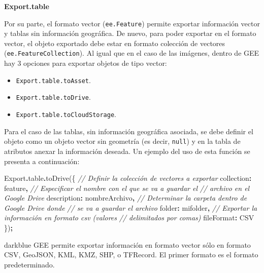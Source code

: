 \documentclass[
  12pt,
  letterpaper,
  twoside]{book}
\newenvironment{Shaded}{\begin{snugshade}}{\end{snugshade}}
\newcommand{\AttributeTok}[1]{\textcolor[rgb]{0.77,0.63,0.00}{#1}}
\newcommand{\CommentTok}[1]{\textcolor[rgb]{0.56,0.35,0.01}{\textit{#1}}}
\newcommand{\DataTypeTok}[1]{\textcolor[rgb]{0.13,0.29,0.53}{#1}}
\newcommand{\FunctionTok}[1]{\textcolor[rgb]{0.00,0.00,0.00}{#1}}
\newcommand{\NormalTok}[1]{#1}
\newcommand{\OperatorTok}[1]{\textcolor[rgb]{0.81,0.36,0.00}{\textbf{#1}}}
\newcommand{\StringTok}[1]{\textcolor[rgb]{0.31,0.60,0.02}{#1}}
\providecommand{\tightlist}{%
  \setlength{\itemsep}{0pt}\setlength{\parskip}{0pt}}
\begin{document}
\textbf{Export.table}

Por su parte, el formato vector (\texttt{ee.Feature}) permite exportar información vector y tablas sin información geográfica. De nuevo, para poder exportar en el formato vector, el objeto exportado debe estar en formato colección de vectores (\texttt{ee.FeatureCollection}). Al igual que en el caso de las imágenes, dentro de GEE hay 3 opciones para exportar objetos de tipo vector:

\begin{itemize}
\tightlist
\item
  \texttt{Export.table.toAsset}.
\item
  \texttt{Export.table.toDrive}.
\item
  \texttt{Export.table.toCloudStorage}.
\end{itemize}

Para el caso de las tablas, sin información geográfica asociada, se debe definir el objeto como un objeto vector sin geometría (es decir, \texttt{null}) y en la tabla de atributos anexar la información deseada. Un ejemplo del uso de esta función se presenta a continuación:

\begin{Shaded}
\begin{Highlighting}[]
\NormalTok{Export}\OperatorTok{.}\AttributeTok{table}\OperatorTok{.}\FunctionTok{toDrive}\NormalTok{(\{}
  \CommentTok{// Definir la colección de vectores a exportar}
  \DataTypeTok{collection}\OperatorTok{:}\NormalTok{ feature}\OperatorTok{,}
  \CommentTok{// Especificar el nombre con el que se va a guardar el }
  \CommentTok{// archivo en el Google Drive}
  \DataTypeTok{description}\OperatorTok{:} \StringTok{\textquotesingle{}nombreArchivo\textquotesingle{}}\OperatorTok{,}
  \CommentTok{// Determinar la carpeta dentro de Google Drive donde}
  \CommentTok{// se va a guardar el archivo}
  \DataTypeTok{folder}\OperatorTok{:} \StringTok{\textquotesingle{}mifolder\textquotesingle{}}\OperatorTok{,}
  \CommentTok{// Exportar la información en formato csv (valores }
  \CommentTok{// delimitados por comas)}
  \DataTypeTok{fileFormat}\OperatorTok{:} \StringTok{\textquotesingle{}CSV\textquotesingle{}}
\NormalTok{\})}\OperatorTok{;}
\end{Highlighting}
\end{Shaded}

\begin{bluebox2}

\begin{awesomeblock}{5pt}{\faLightbulb}{darkblue}
GEE permite exportar información en formato vector sólo en formato CSV, GeoJSON, KML, KMZ, SHP, o TFRecord. El primer formato es el formato predeterminado.

\end{awesomeblock}

\end{bluebox2}
\end{document}
